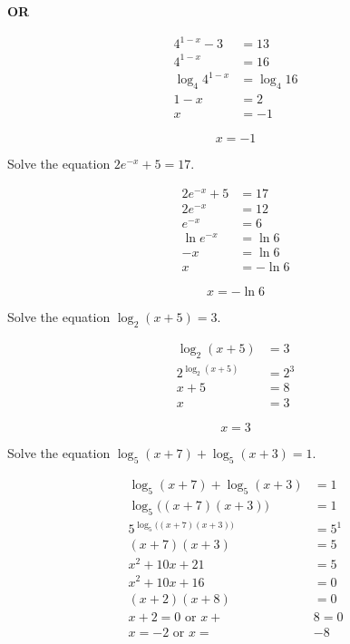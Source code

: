 \documentclass[12pt,letterpaper]{exam}
\begin{document}
\begin{questions}
	\begin{center} {\bfseries OR} \end{center}
	
	\[
	\begin{aligned}
	4^{1 - x} - 3&= 13 \\[0.3cm]
	4^{1 - x}&= 16 \\[0.3cm]
	\log_4 4^{1 - x}&= \log_4 16 \\[0.3cm]
	1 - x&= 2 \\[0.3cm]
	x&= - 1
	\end{aligned}
	\] \pspace
	
	\[ 
	\boxed{x= -1}
	\]





\newpage
\question[5] Solve the equation $2e^{-x} + 5= 17$. \pspace

	\[
	\begin{aligned}
	2e^{-x} + 5&= 17 \\[0.3cm]
	2e^{-x}&= 12 \\[0.3cm]
	e^{-x}&= 6 \\[0.3cm]
	\ln e^{-x}&= \ln 6 \\[0.3cm]
	-x&= \ln 6 \\[0.3cm]
	x&= -\ln 6
	\end{aligned}
	\] \pspace
	
	\[
	\boxed{x= -\ln 6}
	\]





\newpage
\question[5] Solve the equation $\log_2(x + 5)= 3$. \pspace

	\[
	\begin{aligned}
	\log_2(x + 5)&= 3 \\[0.3cm]
	2^{\log_2(x + 5)}&= 2^3 \\[0.3cm]
	x + 5&= 8 \\[0.3cm]
	x&= 3
	\end{aligned}
	\] \pspace
	
	\[
	\boxed{x= 3}
	\]





\newpage
\question[5] Solve the equation $\log_5(x + 7) + \log_5(x + 3)= 1$. \pspace

{\itshape
	\[
	\begin{aligned}
	\log_5(x + 7) + \log_5(x + 3)&= 1 \\[0.3cm]
	\log_5\big( (x + 7)(x + 3) \big)&= 1 \\[0.3cm]
	5^{\log_5\big( (x + 7)(x + 3) \big)}&= 5^1 \\[0.3cm]
	(x + 7)(x + 3)&= 5 \\[0.3cm]
	x^2 + 10x + 21&= 5 \\[0.3cm]
	x^2 + 10x + 16&= 0 \\[0.3cm]
	(x + 2)(x + 8)&= 0 \\[0.3cm]
	x + 2= 0 \text{ or } x +& 8= 0 \\[0.3cm]
	x= -2 \text{ or } x= &-\!8 
	\end{aligned}
	\] \pspace

}
\end{questions}
\end{document}
